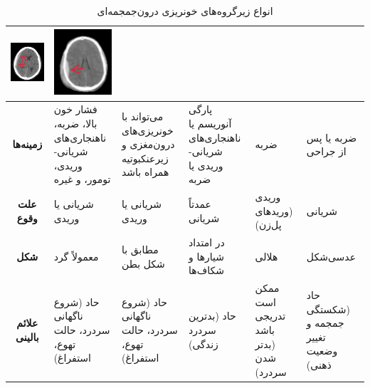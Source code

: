 \begin{table}[ht]
{\begin{tabular}{|c|p{7cm}|p{7cm}|p{7cm}|p{7cm}|p{7cm}|}
\parbox[c][7cm][c]{7cm}{\centering \includegraphics[width=6cm]{Images/Chapter1/subdural.JPG}} & 
\parbox[c][7cm][c]{7cm}{\centering \includegraphics[width=6cm]{Images/Chapter1/Epidural.JPG}} \\ \hline
\textbf{زمینه‌ها} & فشار خون بالا، ضربه، ناهنجاری‌های شریانی-وریدی، تومور، و غیره & می‌تواند با خونریزی‌های درون‌مغزی و زیرعنکبوتیه همراه باشد & پارگی آنوریسم یا ناهنجاری‌های شریانی-وریدی یا ضربه & ضربه & ضربه یا پس از جراحی \\ \hline
\textbf{علت وقوع} & شریانی یا وریدی & شریانی یا وریدی & عمدتاً شریانی & وریدی (وریدهای پل‌زن) & شریانی \\ \hline
\textbf{شکل} & معمولاً گرد & مطابق با شکل بطن & در امتداد شیارها و شکاف‌ها & هلالی & عدسی‌شکل \\ \hline
\textbf{علائم بالینی} & حاد (شروع ناگهانی سردرد، حالت تهوع، استفراغ) & حاد (شروع ناگهانی سردرد، حالت تهوع، استفراغ) & حاد (بدترین سردرد زندگی) & ممکن است تدریجی باشد (بدتر شدن سردرد) & حاد (شکستگی جمجمه و تغییر وضعیت ذهنی) \\ \hline
\end{tabular}}
\caption{انواع زیرگروه‌های خونریزی درون‌جمجمه‌ای
\cite{rsna_hemorrhage_detection_kaggle}}
\label{table: subtype}
\end{table}

